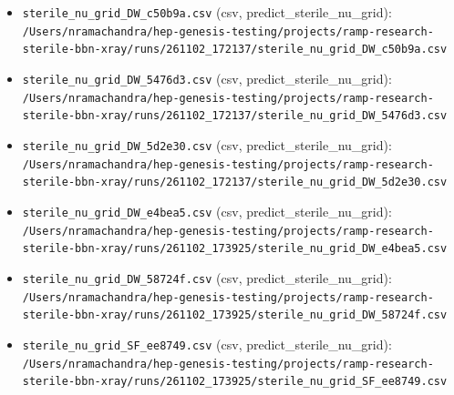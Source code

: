 \documentclass[11pt,a4paper]{article}
\begin{document}
\begin{itemize}
  \item \texttt{sterile\_\allowbreak{}nu\_\allowbreak{}grid\_\allowbreak{}DW\_\allowbreak{}c50b9a.csv} (csv, predict\_sterile\_nu\_grid): \texttt{/\allowbreak{}Users/\allowbreak{}nramachandra/\allowbreak{}hep-genesis-testing/\allowbreak{}projects/\allowbreak{}ramp-research-sterile-bbn-xray/\allowbreak{}runs/\allowbreak{}261102\_\allowbreak{}172137/\allowbreak{}sterile\_\allowbreak{}nu\_\allowbreak{}grid\_\allowbreak{}DW\_\allowbreak{}c50b9a.csv}
  \item \texttt{sterile\_\allowbreak{}nu\_\allowbreak{}grid\_\allowbreak{}DW\_\allowbreak{}5476d3.csv} (csv, predict\_sterile\_nu\_grid): \texttt{/\allowbreak{}Users/\allowbreak{}nramachandra/\allowbreak{}hep-genesis-testing/\allowbreak{}projects/\allowbreak{}ramp-research-sterile-bbn-xray/\allowbreak{}runs/\allowbreak{}261102\_\allowbreak{}172137/\allowbreak{}sterile\_\allowbreak{}nu\_\allowbreak{}grid\_\allowbreak{}DW\_\allowbreak{}5476d3.csv}
  \item \texttt{sterile\_\allowbreak{}nu\_\allowbreak{}grid\_\allowbreak{}DW\_\allowbreak{}5d2e30.csv} (csv, predict\_sterile\_nu\_grid): \texttt{/\allowbreak{}Users/\allowbreak{}nramachandra/\allowbreak{}hep-genesis-testing/\allowbreak{}projects/\allowbreak{}ramp-research-sterile-bbn-xray/\allowbreak{}runs/\allowbreak{}261102\_\allowbreak{}172137/\allowbreak{}sterile\_\allowbreak{}nu\_\allowbreak{}grid\_\allowbreak{}DW\_\allowbreak{}5d2e30.csv}
  \item \texttt{sterile\_\allowbreak{}nu\_\allowbreak{}grid\_\allowbreak{}DW\_\allowbreak{}e4bea5.csv} (csv, predict\_sterile\_nu\_grid): \texttt{/\allowbreak{}Users/\allowbreak{}nramachandra/\allowbreak{}hep-genesis-testing/\allowbreak{}projects/\allowbreak{}ramp-research-sterile-bbn-xray/\allowbreak{}runs/\allowbreak{}261102\_\allowbreak{}173925/\allowbreak{}sterile\_\allowbreak{}nu\_\allowbreak{}grid\_\allowbreak{}DW\_\allowbreak{}e4bea5.csv}
  \item \texttt{sterile\_\allowbreak{}nu\_\allowbreak{}grid\_\allowbreak{}DW\_\allowbreak{}58724f.csv} (csv, predict\_sterile\_nu\_grid): \texttt{/\allowbreak{}Users/\allowbreak{}nramachandra/\allowbreak{}hep-genesis-testing/\allowbreak{}projects/\allowbreak{}ramp-research-sterile-bbn-xray/\allowbreak{}runs/\allowbreak{}261102\_\allowbreak{}173925/\allowbreak{}sterile\_\allowbreak{}nu\_\allowbreak{}grid\_\allowbreak{}DW\_\allowbreak{}58724f.csv}
  \item \texttt{sterile\_\allowbreak{}nu\_\allowbreak{}grid\_\allowbreak{}SF\_\allowbreak{}ee8749.csv} (csv, predict\_sterile\_nu\_grid): \texttt{/\allowbreak{}Users/\allowbreak{}nramachandra/\allowbreak{}hep-genesis-testing/\allowbreak{}projects/\allowbreak{}ramp-research-sterile-bbn-xray/\allowbreak{}runs/\allowbreak{}261102\_\allowbreak{}173925/\allowbreak{}sterile\_\allowbreak{}nu\_\allowbreak{}grid\_\allowbreak{}SF\_\allowbreak{}ee8749.csv}

\end{itemize}
\end{document}
